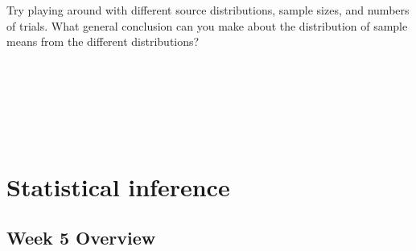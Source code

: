 \documentclass[
]{scrbook}
\begin{document}
\begin{verbatim}






\end{verbatim}

Try playing around with different source distributions, sample sizes, and numbers of trials.
What general conclusion can you make about the distribution of sample means from the different distributions?

\begin{verbatim}






\end{verbatim}

\hypertarget{part-statistical-inference}{%
\part{Statistical inference}\label{part-statistical-inference}}

\hypertarget{Week5}{%
\chapter*{Week 5 Overview}\label{Week5}}
\end{document}
